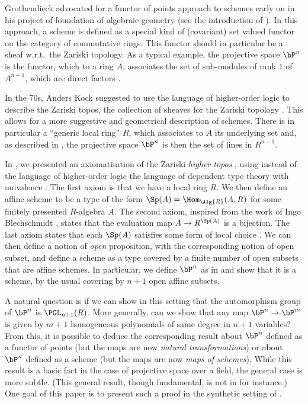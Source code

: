 Grothendieck advocated for a functor of points approach to schemes early on in his
project of foundation of algebraic geometry (see the introduction of \cite{EGAI}).
In this approach, a scheme is defined as a special kind of (covariant) set valued functor
on the category of commutative rings. This functor should in particular
be a sheaf w.r.t.\ the Zariski topology. As a typical example, the projective space $\bP^n$
is the functor, which to a ring $A$,
associates the set of sub-modules of  rank $1$ of $A^{n+1}$, which are direct factors \cite{Demazure,Eisenbud,Jantzen}.

In the 70s, Anders Kock suggested to use the language of higher-order logic \cite{Church40}
to describe the Zariski topos, the collection of sheaves for the Zariski topology \cite{Kock74,kockreyes}.
This allows for
a more suggestive and geometrical description of schemes.
There is in particular a ``generic
local ring'' $R$, which associates to $A$ its underlying set and, as described in \cite{kockreyes},
the projective space $\bP^n$ is then the set of lines in $R^{n+1}$.

In \cite{draft}, we presented an axiomatisation of the Zariski {\em higher topos} \cite{lurie-htt},
using instead of the language of higher-order logic the language of dependent type theory
with univalence \cite{hott}. The first axiom is that we have a local ring $R$. We then define
an affine scheme to be a type of the form $\Sp(A) = \Hom_{\Alg{R}}(A,R)$ for some finitely presented
$R$-algebra $A$. The second axiom, inspired from the work of Ingo Blechschmidt \cite{ingo-thesis},
states that the evaluation map $A\rightarrow R^{\Sp(A)}$ is a bijection. The last axiom states
that each $\Sp(A)$ satisfies some form of local choice \cite{draft}. We can then define a notion
of {\em open} proposition, with the corresponding notion of open subset, and define a scheme as a type
covered by a finite number of open subsets that are affine schemes. In particular, we define
$\bP^n$ as in \cite{kockreyes} and show that it is a scheme, by the usual covering by $n+1$
open affine subsets.%

A natural question is if we can show in this setting that the automorphism group of $\bP^n$
is  $\PGL_{n+1}(R)$.
More generally, can we show that any map $\bP^n\rightarrow \bP^m$ is given by $m+1$ homogeneous
polynomials of same degree in $n+1$ variables?
From this, it is possible to deduce the corresponding result about $\bP^n$ defined as
a functor of points (but the maps are now {\em natural transformations}) or about $\bP^n$ defined
as a scheme (but the maps are now {\em maps of schemes}).
While this result is a basic fact in the case of projective space over a field, the general
case is more subtle.
(This general result, though fundamental, is not in \cite{Hartshorne} for instance.)
One goal of this paper is to present such a proof in the synthetic setting of \cite{draft}.

